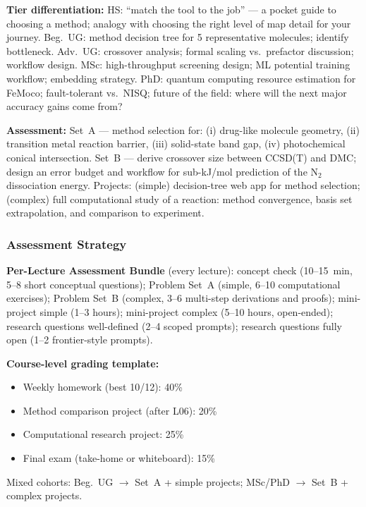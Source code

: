 \documentclass[11pt,a4paper]{article}
\begin{document}
\begin{tcolorbox}[modulebox, title={Module~II.1 / L12: Method Selection in Practice}]
\medskip\textbf{Tier differentiation:}
HS: ``match the tool to the job'' --- a pocket guide to choosing a method;
analogy with choosing the right level of map detail for your journey.
Beg.\ UG: method decision tree for 5 representative molecules; identify bottleneck.
Adv.\ UG: crossover analysis; formal scaling vs.\ prefactor discussion; workflow design.
MSc: high-throughput screening design; ML potential training workflow; embedding strategy.
PhD: quantum computing resource estimation for FeMoco; fault-tolerant vs.\ NISQ;
future of the field: where will the next major accuracy gains come from?

\medskip\textbf{Assessment:}
Set~A --- method selection for: (i) drug-like molecule geometry, (ii) transition metal
  reaction barrier, (iii) solid-state band gap, (iv) photochemical conical intersection.
Set~B --- derive crossover size between CCSD(T) and DMC; design an error budget and workflow
for sub-kJ/mol prediction of the N$_2$ dissociation energy.
Projects: (simple) decision-tree web app for method selection;
(complex) full computational study of a reaction: method convergence, basis set extrapolation,
and comparison to experiment.
\end{tcolorbox}

\subsubsection*{Assessment Strategy}

\begin{tcolorbox}[highlightbox]
\textbf{Per-Lecture Assessment Bundle} (every lecture):
concept check (10--15~min, 5--8 short conceptual questions);
Problem Set~A (simple, 6--10 computational exercises);
Problem Set~B (complex, 3--6 multi-step derivations and proofs);
mini-project simple (1--3 hours);
mini-project complex (5--10 hours, open-ended);
research questions well-defined (2--4 scoped prompts);
research questions fully open (1--2 frontier-style prompts).
\end{tcolorbox}

\medskip
\noindent\textbf{Course-level grading template:}
\begin{itemize}[leftmargin=1.5em]
  \item Weekly homework (best 10/12): 40\%
  \item Method comparison project (after L06): 20\%
  \item Computational research project: 25\%
  \item Final exam (take-home or whiteboard): 15\%
\end{itemize}
Mixed cohorts: Beg.\ UG $\to$ Set~A + simple projects; MSc/PhD $\to$ Set~B + complex projects.
\end{document}
